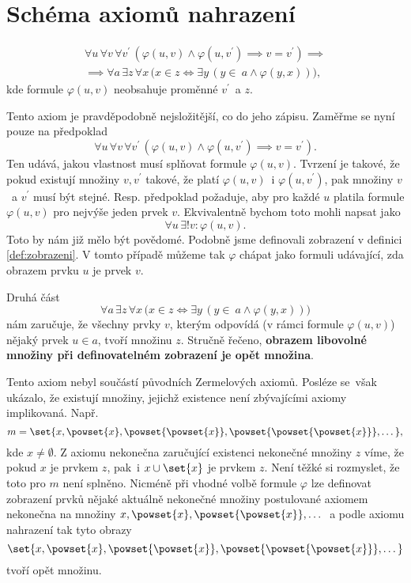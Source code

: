 \section{Schéma axiomů nahrazení}\label{sec:schema_axiomu_nahrazeni}
\begin{align*}
    \forall u\,\forall v\,\forall v^\prime\,(\varphi(u,v) \land \varphi(u,v^\prime) \implies v=v^\prime)\implies\\ \implies \forall a\,\exists z\,\forall x\,\bigl(x\in z \iff \exists y\,(y\in~a \land \varphi(y,x))\bigr),
\end{align*}
kde formule $\varphi(u,v)$ neobsahuje proměnné $v^\prime$~a $z$.\par
Tento axiom je pravděpodobně nejsložitější, co do jeho zápisu. Zaměřme se nyní pouze na předpoklad
\begin{equation*}
    \forall u\,\forall v\,\forall v^\prime\,(\varphi(u,v) \land \varphi(u,v^\prime) \implies v=v^\prime).
\end{equation*}
Ten udává, jakou vlastnost musí splňovat formule $\varphi(u,v)$. Tvrzení je takové, že pokud existují množiny $v,v^\prime$ takové, že platí $\varphi(u,v)$~i $\varphi(u,v^\prime)$, pak množiny $v$~a $v^\prime$ musí být stejné. Resp. předpoklad požaduje, aby pro každé $u$ platila formule $\varphi(u,v)$ pro nejvýše jeden prvek $v$. Ekvivalentně bychom toto mohli napsat jako
\begin{equation*}
    \forall u\,\exists! v: \varphi(u,v).
\end{equation*}
Toto by nám již mělo být povědomé. Podobně jsme definovali zobrazení v definici \ref{def:zobrazeni}. V tomto případě můžeme tak $\varphi$ chápat jako formuli udávající, zda obrazem prvku $u$ je prvek $v$.\par
Druhá část
\begin{equation*}
    \forall a\,\exists z\,\forall x\,\bigl(x\in z \iff \exists y\,(y\in~a \land \varphi(y,x))\bigr)
\end{equation*}
nám zaručuje, že všechny prvky $v$, kterým odpovídá (v rámci formule $\varphi(u,v)$) nějaký prvek $u\in a$, tvoří množinu $z$. Stručně řečeno, \textbf{obrazem libovolné množiny při definovatelném zobrazení je opět množina}.\par
Tento axiom nebyl součástí původních Zermelových axiomů. Posléze se~však ukázalo, že existují množiny, jejichž existence není zbývajícími axiomy implikovaná. Např.
\begin{equation*}
    m=\set{x,\powset{x},\powset{\powset{x}},\powset{\powset{\powset{x}}},\dots},
\end{equation*}
kde $x\neq\emptyset$. Z axiomu nekonečna zaručující existenci nekonečné množiny $z$ víme, že pokud $x$ je prvkem $z$, pak~i $x\cup\set{x}$ je prvkem $z$. Není těžké si rozmyslet, že toto pro $m$ není splněno. Nicméně při vhodné volbě formule $\varphi$ lze definovat zobrazení prvků nějaké aktuálně nekonečné množiny postulované axiomem nekonečna na množiny $x,\powset{x},\powset{\powset{x}},\dots$~a podle axiomu nahrazení tak tyto obrazy
\begin{equation*}
    \set{x,\powset{x},\powset{\powset{x}},\powset{\powset{\powset{x}}},\dots}
\end{equation*}
tvoří opět množinu.